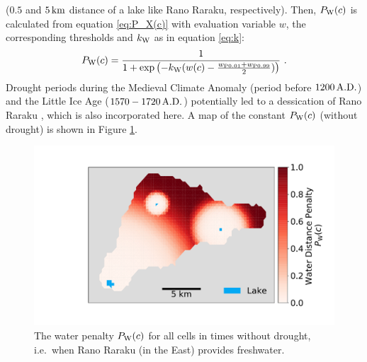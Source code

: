 ($0.5$ and $5\, {\rm km}$ distance of a lake like Rano Raraku, respectively).
Then, $P_{\rm W}(c)$ is calculated from equation \ref{eq:P_X(c)} with evaluation variable $w$, the corresponding thresholds and $k_{\rm W}$ as in equation \ref{eq:k}:
\begin{equation}
	P_{\rm W}(c) = \frac{1}{1+\exp\left( - k_{\rm W} (w(c)-\frac{w_{\rm P0.01}+w_{\rm P0.99}}{2}) \right)} \ .
\end{equation}
Drought periods during the Medieval Climate Anomaly (period before $1200\, {\rm A.D.}$) and the Little Ice Age ($1570-1720 \, {\rm A.D.}$) potentially led to a dessication of Rano Raraku \citep{Rull2020}, which is also incorporated here. 
A map of the constant $P_{\rm W}(c)$ (without drought) is shown in Figure \ref{fig:plotpw}. 
\begin{figure}
	\centering
	\includegraphics[width=1\linewidth]{images/Plot_PW}
	\caption{The water penalty $P_{\rm W}(c)$ for all cells in times without drought, i.e.\ when Rano Raraku (in the East) provides freshwater.}
	\label{fig:plotpw}
\end{figure}


